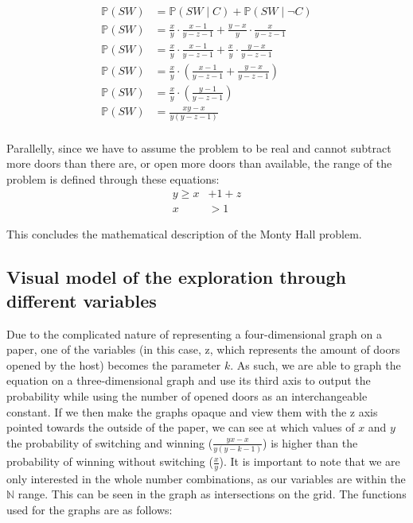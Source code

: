\documentclass{article}
\begin{document}
\begin{equation}
\begin{aligned}
\mathbb{P}(SW)&=\mathbb{P}(SW\mid C)+\mathbb{P}(SW\mid\neg C)\\
\mathbb{P}(SW)&=\frac{x}{y} \cdot \frac{x-1}{y-z-1}+\frac{y-x}{y} \cdot \frac{x}{y-z-1}\\
\mathbb{P}(SW)&=\frac{x}{y} \cdot \frac{x-1}{y-z-1}+\frac{x}{y} \cdot \frac{y-x}{y-z-1}\\
\mathbb{P}(SW)&=\frac{x}{y} \cdot \left(\frac{x-1}{y-z-1}+\frac{y-x}{y-z-1}\right)\\
\mathbb{P}(SW)&=\frac{x}{y} \cdot \left(\frac{y-1}{y-z-1}\right)\\
\mathbb{P}(SW)&=\frac{xy-x}{y(y-z-1)}\\
\end{aligned}
\end{equation}
\par
Parallelly, since we have to assume the problem to be real and cannot subtract more doors than there are, or open more doors than available, the range of the problem is defined through these equations:
\begin{equation}
\begin{aligned}
y \geq x&+1+z\\
x&>1
\end{aligned}
\end{equation}
\par
This concludes the mathematical description of the Monty Hall problem.

\subsection*{Visual model of the exploration through different variables}
Due to the complicated nature of representing a four-dimensional graph on a paper, one of the variables (in this case, z, which represents the amount of doors opened by the host) becomes the parameter $k$. As such, we are able to graph the equation on a three-dimensional graph and use its third axis to output the probability while using the number of opened doors as an interchangeable constant. If we then make the graphs opaque and view them with the z axis pointed towards the outside of the paper, we can see at which values of $x$ and $y$ the probability of switching and winning ($\frac{y x-x}{y(y-k-1)}$) is higher than the probability of winning without switching ($\frac{x}{y}$). It is important to note that we are only interested in the whole number combinations, as our variables are within the $\mathbb{N}$ range. This can be seen in the graph as intersections on the grid. The functions used for the graphs are as follows:
\end{document}
